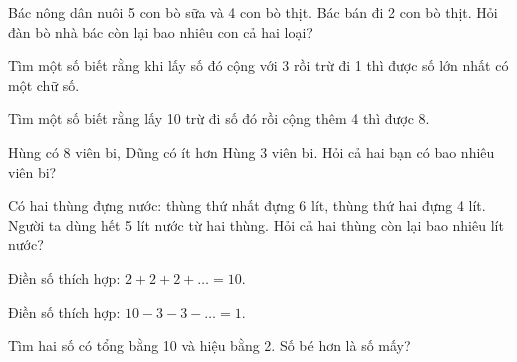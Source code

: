 \begin{ex}
Bác nông dân nuôi 5 con bò sữa và 4 con bò thịt. Bác bán đi 2 con bò thịt. Hỏi đàn bò nhà bác còn lại bao nhiêu con cả hai loại?
\end{ex}

\begin{ex}
Tìm một số biết rằng khi lấy số đó cộng với 3 rồi trừ đi 1 thì được số lớn nhất có một chữ số.
\end{ex}

\begin{ex}
Tìm một số biết rằng lấy 10 trừ đi số đó rồi cộng thêm 4 thì được 8.
\end{ex}

\begin{ex}
Hùng có 8 viên bi, Dũng có ít hơn Hùng 3 viên bi. Hỏi cả hai bạn có bao nhiêu viên bi?
\end{ex}

\begin{ex}
Có hai thùng đựng nước: thùng thứ nhất đựng 6 lít, thùng thứ hai đựng 4 lít. Người ta dùng hết 5 lít nước từ hai thùng. Hỏi cả hai thùng còn lại bao nhiêu lít nước?
\end{ex}

\begin{ex}
Điền số thích hợp: $2 + 2 + 2 + \dots = 10$.
\end{ex}

\begin{ex}
Điền số thích hợp: $10 - 3 - 3 - \dots = 1$.
\end{ex}

\begin{ex}
Tìm hai số có tổng bằng 10 và hiệu bằng 2. Số bé hơn là số mấy?
\end{ex}


